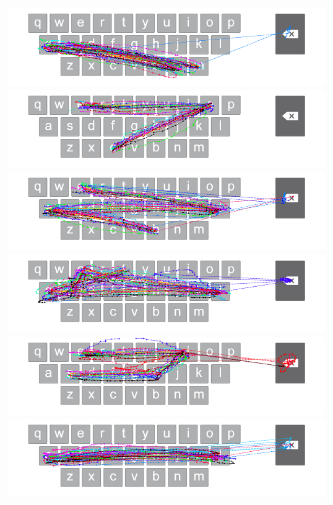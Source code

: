 \begin{figure}[!b]
	\begin{minipage}[t]{8in}
	\hspace{-20pt}
	\begin{minipage}[t]{3.1in}
		\includegraphics[width=3.3in]{Figures/fig_mans_paths}
	\end{minipage}
	\begin{minipage}[t]{3in}
		\includegraphics[width=3.3in]{Figures/fig_core_paths}
	\end{minipage}
	\end{minipage}
	
	\begin{minipage}[t]{8in}
	\hspace{-20pt}
	\begin{minipage}[t]{3.1in}
		\includegraphics[width=3.3in]{Figures/fig_bale_paths}
	\end{minipage}
	\begin{minipage}[t]{3in}
		\includegraphics[width=3.3in]{Figures/fig_tales_paths}
	\end{minipage}
	\end{minipage}
	
	\begin{minipage}[t]{8in}
	\hspace{-20pt}
	\begin{minipage}[t]{3.1in}
		\includegraphics[width=3.3in]{Figures/fig_shier_paths}
	\end{minipage}
	\begin{minipage}[t]{3in}
		\includegraphics[width=3.3in]{Figures/fig_falls_paths}
	\end{minipage}
	\end{minipage}
	

\end{figure}
